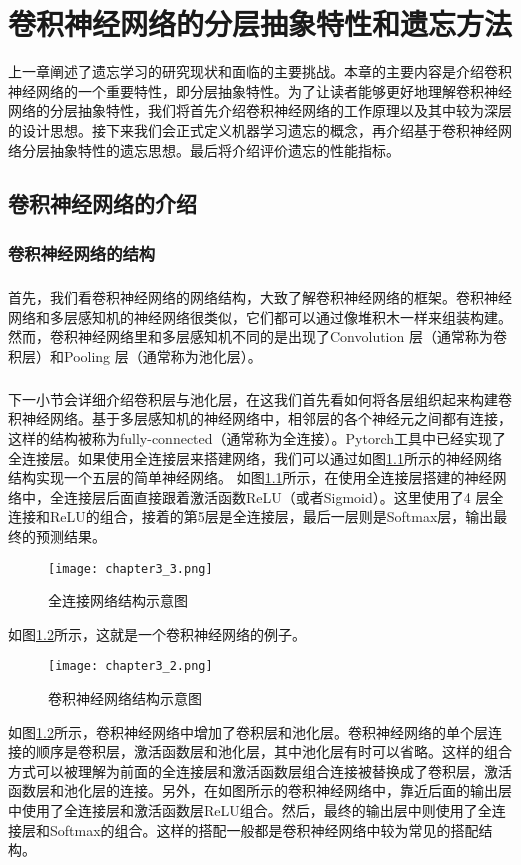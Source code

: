 
\chapter{卷积神经网络的分层抽象特性和遗忘方法}
上一章阐述了遗忘学习的研究现状和面临的主要挑战。本章的主要内容是介绍卷积神经网络的一个重要特性，即分层抽象特性。为了让读者能够更好地理解卷积神经网络的分层抽象特性，我们将首先介绍卷积神经网络的工作原理以及其中较为深层的设计思想。接下来我们会正式定义机器学习遗忘的概念，再介绍基于卷积神经网络分层抽象特性的遗忘思想。最后将介绍评价遗忘的性能指标。

\section{卷积神经网络的介绍}

\subsection{卷积神经网络的结构}
\paragraph{}首先，我们看卷积神经网络的网络结构，大致了解卷积神经网络的框架。卷积神经网络和多层感知机的神经网络很类似，它们都可以通过像堆积木一样来组装构建。然而，卷积神经网络里和多层感知机不同的是出现了Convolution 层（通常称为卷积层）和Pooling 层（通常称为池化层）。
\paragraph{}下一小节会详细介绍卷积层与池化层，在这我们首先看如何将各层组织起来构建卷积神经网络。基于多层感知机的神经网络中，相邻层的各个神经元之间都有连接，这样的结构被称为fully-connected（通常称为全连接）。Pytorch工具中已经实现了全连接层。如果使用全连接层来搭建网络，我们可以通过如图\ref{fig:chapter3_3}所示的神经网络结构实现一个五层的简单神经网络。
如图\ref{fig:chapter3_3}所示，在使用全连接层搭建的神经网络中，全连接层后面直接跟着激活函数ReLU（或者Sigmoid）。这里使用了4 层全连接和ReLU的组合，接着的第5层是全连接层，最后一层则是Softmax层，输出最终的预测结果。
\begin{figure}
    \centering
    \texttt{[image: chapter3\_3.png]}
    \caption{全连接网络结构示意图}
    \label{fig:chapter3_3}
\end{figure}
如图\ref{fig:chapter3_2}所示，这就是一个卷积神经网络的例子。
\begin{figure}
    \centering
    \texttt{[image: chapter3\_2.png]}
    \caption{卷积神经网络结构示意图}
    \label{fig:chapter3_2}
\end{figure}
如图\ref{fig:chapter3_2}所示，卷积神经网络中增加了卷积层和池化层。卷积神经网络的单个层连接的顺序是卷积层，激活函数层和池化层，其中池化层有时可以省略。这样的组合方式可以被理解为前面的全连接层和激活函数层组合连接被替换成了卷积层，激活函数层和池化层的连接。另外，在如图所示的卷积神经网络中，靠近后面的输出层中使用了全连接层和激活函数层ReLU组合。然后，最终的输出层中则使用了全连接层和Softmax的组合。这样的搭配一般都是卷积神经网络中较为常见的搭配结构。
